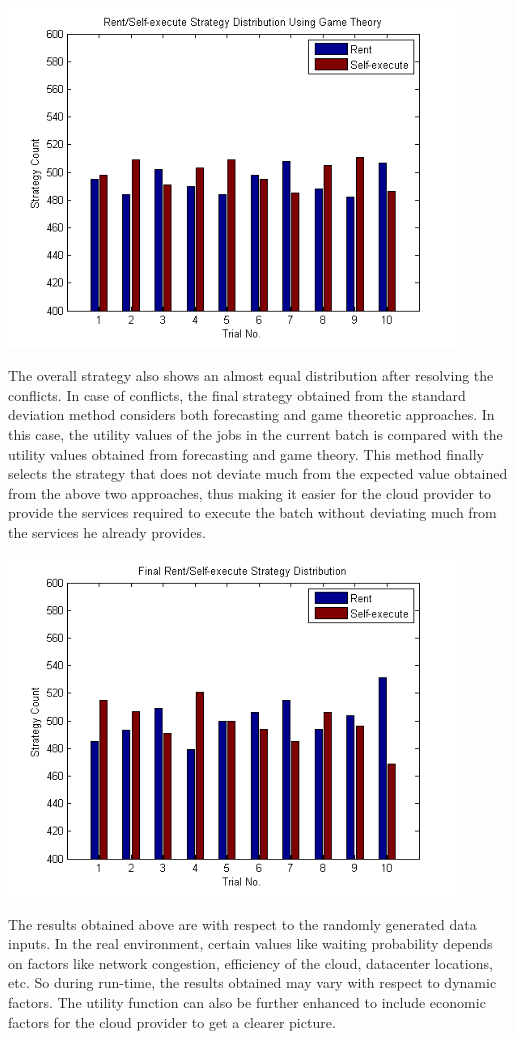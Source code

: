 \begin{center}
\includegraphics[width=0.9\textwidth]{Gametheory}\\[0.3cm]
\end{center}
The overall strategy also shows an almost equal distribution after resolving the conflicts. In case of conflicts, the final strategy obtained from the standard deviation method considers both forecasting and game theoretic approaches. In this case, the utility values of the jobs in the current batch is compared with the utility values obtained from forecasting and game theory. This method finally selects the strategy that does not deviate much from the expected value obtained from the above two approaches, thus making it easier for the cloud provider to provide the services required to execute the batch without deviating much from the services he already provides.\\[0.3cm]
\begin{center}
\includegraphics[width=0.9\textwidth]{final}\\[0.3cm]
\end{center}
The results obtained above are with respect to the randomly generated data inputs. In the real environment, certain values like waiting probability depends on factors like network congestion, efficiency of the cloud, datacenter locations, etc. So during run-time, the results obtained may vary with respect to dynamic factors. The utility function can also be further enhanced to include economic factors for the cloud provider to get a clearer picture.

